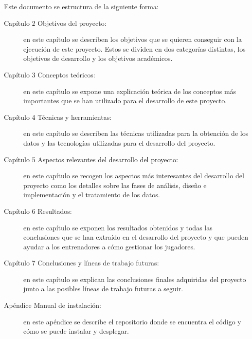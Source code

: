 Este documento se estructura de la siguiente forma:
\begin{description}

\item[Capítulo 2 Objetivos del proyecto:] en este capítulo se describen los objetivos que se quieren conseguir con la ejecución de este proyecto. Estos se dividen en dos categorías distintas,
los objetivos de desarrollo y los objetivos académicos.


\item[Capítulo 3 Conceptos teóricos:] en este capítulo se expone una explicación teórica de los conceptos más importantes que se han utilizado para el desarrollo de este proyecto.

\item[Capítulo 4 Técnicas y herramientas:] en este capítulo se describen las técnicas utilizadas para la obtención de los datos y las tecnologías utilizadas para el desarrollo del proyecto.


\item[Capítulo 5 Aspectos relevantes del desarrollo del proyecto:] en este capítulo se recogen los aspectos más interesantes del desarrollo del proyecto como los detalles sobre las fases de análisis, diseño e implementación y el tratamiento de los datos.


\item[Capítulo 6 Resultados:] en este capítulo se exponen los resultados obtenidos y todas las conclusiones que se han extraído en el desarrollo del proyecto y que pueden ayudar a los entrenadores a cómo gestionar los jugadores.


\item[Capítulo 7 Conclusiones y líneas de trabajo futuras:] en este capítulo se explican las conclusiones finales adquiridas del proyecto junto a las posibles líneas de trabajo futuras a seguir.

\item[Apéndice Manual de instalación:] en este apéndice se describe el repositorio donde se encuentra el código y cómo se puede instalar y desplegar.

\end{description}




